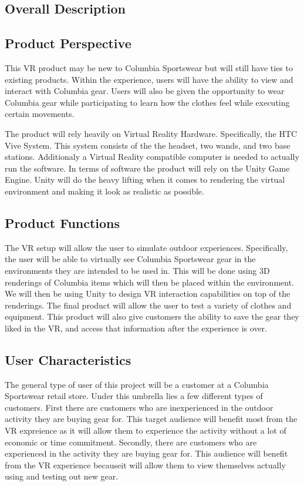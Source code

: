 \documentclass[10pt,journal,compsoc,onecolumn, draftclsnofoot]{IEEEtran}
\begin{document}
\begin{bibunit}
\section{Overall Description}
\subsection{Product Perspective}
This VR product may be new to Columbia Sportswear but will still have ties to
existing products. Within the experience, users will have the ability to view
and interact with Columbia gear. Users will also be given the opportunity to
wear Columbia gear while participating to learn how the clothes feel while
executing certain movements.

The product will rely heavily on Virtual Reality Hardware. Specifically, the HTC
Vive System. This system consists of the the headset, two
wands, and two base stations. Additionaly a Virtual Reality compatible computer
is needed to actually run the software. In terms of software the
product will rely on the Unity Game Engine. Unity will do the heavy lifting
when it comes to rendering the virtual environment and making it look as realistic
as possible.

\subsection{Product Functions}
The VR setup will allow the user to simulate outdoor experiences.
Specifically, the user will be able to virtually see Columbia Sportswear
gear in the environments they are intended to be used in.
This will be done using 3D renderings of Columbia items which will then be placed
within the environment. We will then be using Unity to design VR interaction
capabilities on top of the renderings. The final product will allow the user to
test a variety of clothes and equipment. This product will also give customers
the ability to save the gear they liked in the VR, and access that information
after the experience is over.

\subsection{User Characteristics}
The general type of user of this project will be a customer at a Columbia
Sportswear retail store. Under this umbrella lies a few different types of
customers. First there are customers who are inexperienced in the outdoor
activity they are buying gear for. This target audience will benefit most
from the VR expreience as it will allow them to experience the activity without
a lot of economic or time commitment. Secondly, there are customers who are
experienced in the activity they are buying gear for. This audience will benefit
from the VR experience becauseit will allow them to view themselves actually
using and testing out new gear.


\end{bibunit}
\end{document}
